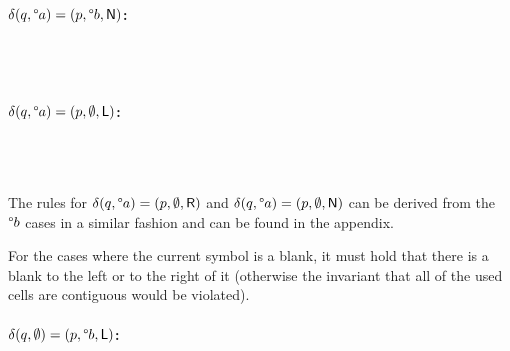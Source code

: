 \documentclass[a4paper,UKenglish,cleveref, autoref]{lipics-v2019}
\begin{document}
\paragraph*{$\delta(q, \degree a) = (p, \degree b, \textsf{N})$:}
\begin{center}
   \\[3ex]
   \\[3ex]
\end{center}

\paragraph*{$\delta(q, \degree a) = (p, \emptyset, \textsf{L})$:}
\begin{center}
   \\[3ex]
   \\[3ex]
\end{center}

The rules for $\delta(q, \degree a) = (p, \emptyset, \textsf{R})$ and $\delta(q, \degree a) = (p, \emptyset, \textsf{N})$ can be derived from the $\degree b$ cases in a similar fashion and can be found in the appendix.

For the cases where the current symbol is a blank, it must hold that there is a blank to the left or to the right of it (otherwise the invariant that all of the used cells are contiguous would be violated).
\paragraph*{$\delta(q, \emptyset) = (p, \degree b, \textsf{L})$:}
\begin{center}
   \\[3ex]
   \\[3ex]
\end{center}
\end{document}
